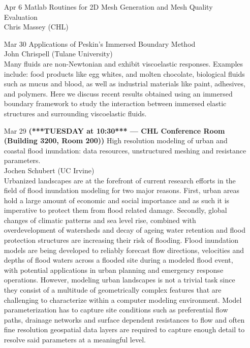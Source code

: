 \documentclass[12]{article}
\begin{document}
\begin{enumerate}
\item[Apr 6]Matlab Routines for 2D Mesh Generation and Mesh Quality Evaluation\\Chris Massey (CHL)\\

\item[Mar 30]Applications of Peskin's Immersed Boundary Method\\ John Chrispell (Tulane University) \\
Many fluids are non-Newtonian and exhibit viscoelastic responses.
Examples include: food products like egg whites, and molten chocolate,
biological
fluids such as mucus and blood, as well as industrial materials like
paint, adhesives, and polymers. Here we discuss recent results obtained
using an immersed boundary framework to study the interaction between
immersed elastic structures and surrounding viscoelastic fluids.

\item[Mar 29 {\bf (***TUESDAY at 10:30*** --- CHL Conference Room (Building 3200, Room 200))}]High resolution modeling of urban and coastal flood inundation:
  data resources, unstructured meshing and resistance parameters. \\ Jochen Schubert (UC Irvine) \\
  Urbanized landscapes are at the forefront of current research
  efforts in the field of flood inundation modeling for two major
  reasons. First, urban areas hold a large amount of economic and
  social importance and as such it is imperative to protect them from
  flood related damage. Secondly, global changes of climatic patterns
  and sea level rise, combined with overdevelopment of watersheds and
  decay of ageing water retention and flood protection structures are
  increasing their risk of flooding. Flood inundation models are being
  developed to reliably forecast flow directions, velocities and
  depths of flood waters across a flooded site during a modeled flood
  event, with potential applications in urban planning and emergency
  response operations. However, modeling urban landscapes is not a
  trivial task since they consist of a multitude of geometrically
  complex features that are challenging to characterize within a
  computer modeling environment. Model parameterization has to capture
  site conditions such as preferential flow paths, drainage networks
  and surface dependent resistances to flow and often fine resolution
  geospatial data layers are required to capture enough detail to
  resolve said parameters at a meaningful level.


\end{enumerate}
\end{document}
